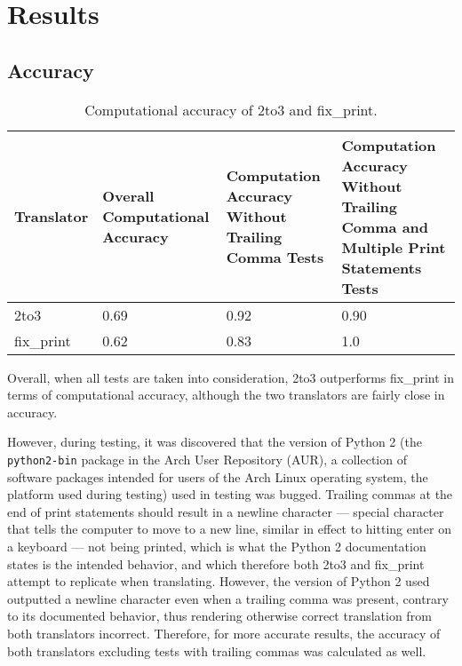\section{Results}

\subsection{Accuracy}
\begin{table*}[ht]
    \begin{tabular}{@{}l|lll@{}}
    \toprule
    Translator & Overall Computational Accuracy & Computation Accuracy Without Trailing Comma Tests & Computation Accuracy Without Trailing Comma and Multiple Print Statements Tests \\ \midrule
    2to3       & 0.69                         & 0.92                                      & 0.90                                                                             \\
    fix\_print & 0.62                          & 0.83                                      & 1.0                                                                               \\ \bottomrule
    \end{tabular}
    \caption{Computational accuracy of 2to3 and fix\_print.}
\end{table*}

Overall, when all tests are taken into consideration, 2to3 outperforms fix\_print in terms of computational accuracy, although the two translators are fairly close in accuracy.

However, during testing, it was discovered that the version of Python 2 (the \verb|python2-bin| package in the Arch User Repository (AUR), a collection of software packages intended for users of the Arch Linux operating system, the platform used during testing) used in testing was bugged. Trailing commas at the end of print statements should result in a newline character --- special character that tells the computer to move to a new line, similar in effect to hitting enter on a keyboard --- not being printed, which is what the Python 2 documentation states is the intended behavior, and which therefore both 2to3 and fix\_print attempt to replicate when translating. However, the version of Python 2 used outputted a newline character even when a trailing comma was present, contrary to its documented behavior, thus rendering otherwise correct translation from both translators incorrect. Therefore, for more accurate results, the accuracy of both translators excluding tests with trailing commas was calculated as well.

